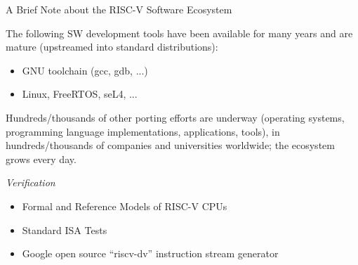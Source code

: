 \documentclass{article}
\begin{document}
\begin{center}
  {\Huge
    A Brief Note about the RISC-V Software Ecosystem}

  \vspace*{1in}

  \begin{minipage}{9in}\LARGE
    The following SW development tools have been available for many
    years and are mature (upstreamed into standard distributions):

    \begin{itemize}
    \item GNU toolchain (gcc, gdb, ...)
    \item Linux, FreeRTOS, seL4, ...
    \end{itemize}

    \vspace{1in}

    Hundreds/thousands of other porting efforts are underway
    (operating systems, programming language implementations,
    applications, tools), in hundreds/thousands of companies and
    universities worldwide; the ecosystem grows every day.

  \end{minipage}

\end{center}

\clearpage


\begin{center}\Huge
  \vspace*{2in}

  \emph{Verification}

  \vspace*{1in}
  
  \begin{minipage}{7in}\LARGE
    \begin{itemize}
    \item Formal and Reference Models of RISC-V CPUs
    \item Standard ISA Tests
    \item Google open source ``riscv-dv'' instruction stream generator
    \end{itemize}
  \end{minipage}

\end{center}

\clearpage
\end{document}
